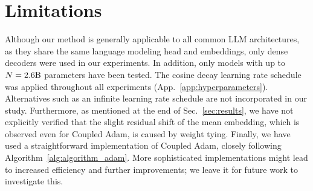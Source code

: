\section{Limitations}

Although our method is generally applicable to all common LLM architectures, as they share the same language modeling head and embeddings, only dense decoders were used in our experiments. 
In addition, only models with up to $N=2.6\rm B$ parameters have been tested.
The cosine decay learning rate schedule was applied throughout all experiments (App.~\ref{app:hyperparameters}). Alternatives such as an infinite learning rate schedule are not incorporated in our study.
Furthermore, as mentioned at the end of Sec.~\ref{sec:results}, we have not explicitly verified that the slight residual shift of the mean embedding, which is observed even for Coupled Adam, is caused by weight tying.
Finally, we have used a straightforward implementation of Coupled Adam, closely following Algorithm~\ref{alg:algorithm_adam}. More sophisticated implementations might lead to increased efficiency and further improvements; we leave it for future work to investigate this.
